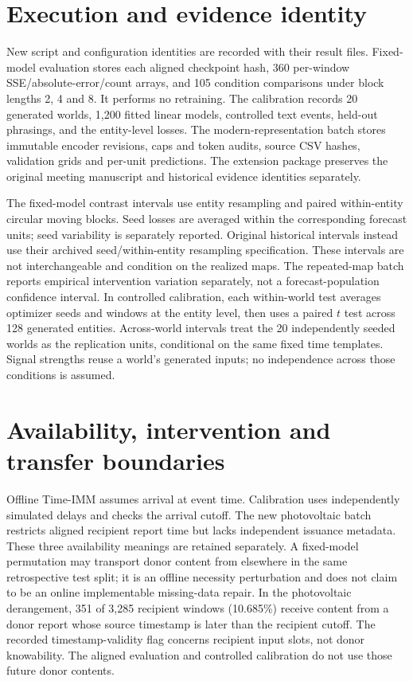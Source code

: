 \section{Execution and evidence identity}

New script and configuration identities are recorded with their result files. Fixed-model evaluation stores each aligned checkpoint hash, 360 per-window SSE/absolute-error/count arrays, and 105 condition comparisons under block lengths 2, 4 and 8. It performs no retraining. The calibration records 20 generated worlds, 1,200 fitted linear models, controlled text events, held-out phrasings, and the entity-level losses. The modern-representation batch stores immutable encoder revisions, caps and token audits, source CSV hashes, validation grids and per-unit predictions. The extension package preserves the original meeting manuscript and historical evidence identities separately.

The fixed-model contrast intervals use entity resampling and paired within-entity circular moving blocks. Seed losses are averaged within the corresponding forecast units; seed variability is separately reported. Original historical intervals instead use their archived seed/within-entity resampling specification. These intervals are not interchangeable and condition on the realized maps. The repeated-map batch reports empirical intervention variation separately, not a forecast-population confidence interval. In controlled calibration, each within-world test averages optimizer seeds and windows at the entity level, then uses a paired $t$ test across 128 generated entities. Across-world intervals treat the 20 independently seeded worlds as the replication units, conditional on the same fixed time templates. Signal strengths reuse a world's generated inputs; no independence across those conditions is assumed.

\section{Availability, intervention and transfer boundaries}

Offline Time-IMM assumes arrival at event time. Calibration uses independently simulated delays and checks the arrival cutoff. The new photovoltaic batch restricts aligned recipient report time but lacks independent issuance metadata. These three availability meanings are retained separately. A fixed-model permutation may transport donor content from elsewhere in the same retrospective test split; it is an offline necessity perturbation and does not claim to be an online implementable missing-data repair. In the photovoltaic derangement, 351 of 3,285 recipient windows (10.685\%) receive content from a donor report whose source timestamp is later than the recipient cutoff. The recorded timestamp-validity flag concerns recipient input slots, not donor knowability. The aligned evaluation and controlled calibration do not use those future donor contents.

